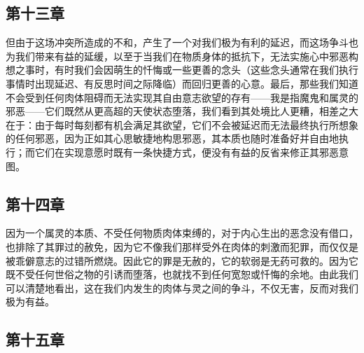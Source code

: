 
\subsection{第十三章}

\par

但由于这场冲突所造成的不和，产生了一个对我们极为有利的延迟，而这场争斗也为我们带来有益的延缓，以至于当我们在物质身体的抵抗下，无法实施心中邪恶构想之事时，有时我们会因萌生的忏悔或一些更善的念头（这些念头通常在我们执行事情时出现延迟、有反思时间之际降临）而回归更善的心意。最后，那些我们知道不会受到任何肉体阻碍而无法实现其自由意志欲望的存有——我是指魔鬼和属灵的邪恶——它们既然从更高超的天使状态堕落，我们看到其处境比人更糟，相差之大在于：由于每时每刻都有机会满足其欲望，它们不会被延迟而无法最终执行所想象的任何邪恶，因为正如其心思敏捷地构思邪恶，其本质也随时准备好并自由地执行；而它们在实现意愿时既有一条快捷方式，便没有有益的反省来修正其邪恶意图。\par


\subsection{第十四章}

\par

因为一个属灵的本质、不受任何物质肉体束缚的，对于内心生出的恶念没有借口，也排除了其罪过的赦免，因为它不像我们那样受外在肉体的刺激而犯罪，而仅仅是被乖僻意志的过错所燃烧。因此它的罪是无赦的，它的软弱是无药可救的。因为它既不受任何世俗之物的引诱而堕落，也就找不到任何宽恕或忏悔的余地。由此我们可以清楚地看出，这在我们内发生的肉体与灵之间的争斗，不仅无害，反而对我们极为有益。\par


\subsection{第十五章}

\par

